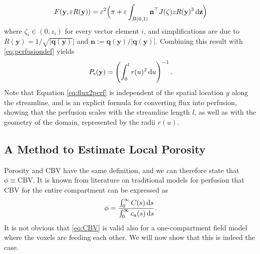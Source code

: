 \documentclass[journal,twocolumn]{IEEEtran}
\newcommand{\ca}{c_\mathrm{a}}
\newcommand{\Perfs}{P_{\mathrm{s}}}
\newcommand{\vq}{\mathbf{q}}
\newcommand{\vy}{\mathbf{y}}
\begin{document}
	\begin{equation}
		F(\vy,\varepsilon R(\vy))
		= \varepsilon^2 \Big(\pi + \varepsilon \int_{B(0,1)} \mathbf{n}^\top J(\zeta)zR(\vy)^3 \diffint \mathbf{z} \Big)
	\end{equation}
	where $\zeta_i \in (0,z_i)$ for every vector element $i$, and simplifications are due to $R(\vy) = 1/\sqrt{\vert \vq(\vy)} \vert$ and $\mathbf{n}:=\vq(\vy)/\vert \vq(\vy) \vert$.
	Combining this result with \eqref{eq:perfusiondef} yields
	\begin{equation}\label{eq:flux2perf}
		\Perfs(\vy) = \left(\int_0^l r(u)^2 \diffint u\right)^{-1}.
	\end{equation}
	Note that Equation \eqref{eq:flux2perf} is independent of the spatial location $y$ along the streamline, and is an explicit formula for converting flux into perfusion, showing that the perfusion scales with the streamline length $l$, as well as with the geometry of the domain, represented by the radii $r(u)$.


	\subsection{A Method to Estimate Local Porosity}\label{sec:CBV}

	Porosity and CBV have the same definition, and we can therefore state that $\phi \equiv \mathrm{CBV}$. It is known from literature on traditional models \cite{sourbron13} for perfusion that CBV for the entire compartment can be expressed as
	\begin{equation}
		\phi = \frac{\int_0^\infty C(s) \diffint s}{\int_0^\infty \ca(s) \diffint s}.
		\label{eq:CBV}
	\end{equation}
	It is not obvious that \eqref{eq:CBV} is valid also for a one-compartment field model where the voxels are feeding each other. 
	We will now show that this is indeed the case.
	
\end{document}
